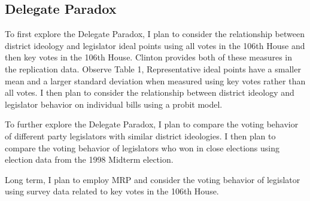 \documentclass[10pt,letterpaper]{article}
\begin{document}
\newpage

\subsection{Delegate Paradox}


To first explore the Delegate Paradox, I plan to consider the relationship between district ideology and legislator ideal points using all votes in the 106th House and then key votes in the 106th House. Clinton provides both of these measures in the replication data. Observe Table 1, Representative ideal points have a smaller mean and a larger standard deviation when measured using key votes rather than all votes. I then plan to consider the relationship between district ideology and legislator behavior on individual bills using a probit model.

To further explore the Delegate Paradox, I plan to compare the voting behavior of different party legislators with similar district ideologies. I then plan to compare the voting behavior of legislators who won in close elections using election data from the 1998 Midterm election.

Long term, I plan to employ MRP and consider the voting behavior of legislator using survey data related to key votes in the 106th House.

\newpage




% 
\end{document}
